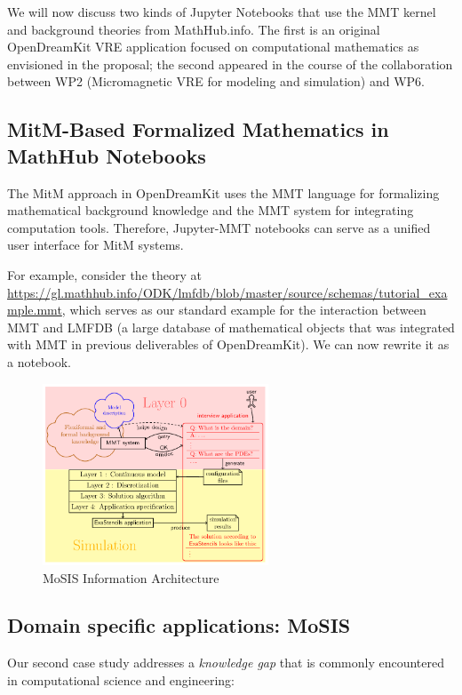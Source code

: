 We will now discuss two kinds of Jupyter Notebooks that use the MMT kernel and background theories from MathHub.info.
The first is an original OpenDreamKit VRE application focused on computational mathematics as envisioned in the proposal; the second appeared in the course of the collaboration between WP2 (Micromagnetic VRE for modeling and simulation) and WP6. 

\subsection{MitM-Based Formalized Mathematics in MathHub Notebooks}

The MitM approach in  OpenDreamKit uses the MMT language for formalizing mathematical background knowledge and the MMT system for integrating computation tools.
Therefore, Jupyter-MMT notebooks can serve as a unified user interface for MitM systems.

For example, consider the theory at \url{https://gl.mathhub.info/ODK/lmfdb/blob/master/source/schemas/tutorial_example.mmt}, which serves as our standard example for the interaction between MMT and LMFDB (a large database of mathematical objects that was integrated with MMT in previous deliverables of OpenDreamKit).
We can now rewrite it as a notebook.

\begin{figure}[ht]\centering
  \includegraphics[width=0.6\textwidth]{proto}
  \caption{MoSIS Information Architecture}\label{fig:prototype}
\end{figure}

\subsection{Domain specific applications: MoSIS}

Our second case study addresses a \emph{knowledge gap} that is commonly encountered in computational science and engineering:

